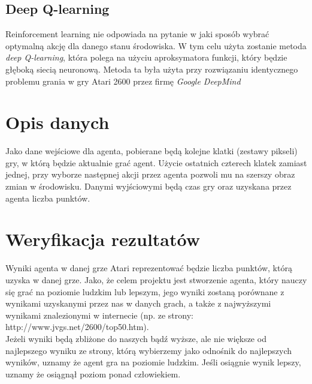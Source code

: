 \documentclass[12pt]{article}
\begin{document}
\subsection{Deep Q-learning}
Reinforcement learning nie odpowiada na pytanie w jaki sposób wybrać optymalną akcję dla danego stanu środowiska. W tym celu użyta zostanie metoda \textit{deep Q-learning}, która polega na użyciu aproksymatora funkcji, który będzie głęboką siecią neuronową. Metoda ta była użyta przy rozwiązaniu identycznego problemu grania w gry Atari 2600 przez firmę \textit{Google DeepMind}

\section{Opis danych}
Jako dane wejściowe dla agenta, pobierane będą kolejne klatki (zestawy pikseli) gry, w którą będzie aktualnie grać agent. Użycie ostatnich czterech klatek zamiast jednej, przy wyborze następnej akcji przez agenta pozwoli mu na szerszy obraz zmian w środowisku. Danymi wyjściowymi będą czas gry oraz uzyskana przez agenta liczba punktów.

\section{Weryfikacja rezultatów}
Wyniki agenta w danej grze Atari reprezentować będzie liczba punktów, którą uzyska w danej grze. Jako, że celem projektu jest stworzenie agenta, który nauczy się grać na poziomie ludzkim lub lepszym, jego wyniki zostaną porównane z wynikami uzyskanymi przez nas w danych grach, a także z najwyższymi wynikami znalezionymi w internecie (np. ze strony: http://www.jvgs.net/2600/top50.htm). \\ Jeżeli wyniki będą zbliżone do naszych bądź wyższe, ale nie większe od najlepszego wyniku ze strony, którą wybierzemy jako odnośnik do najlepszych wyników, uznamy że agent gra na poziomie ludzkim. Jeśli osiągnie wynik lepszy, uznamy że osiągnął poziom ponad człowiekiem.
\end{document}
